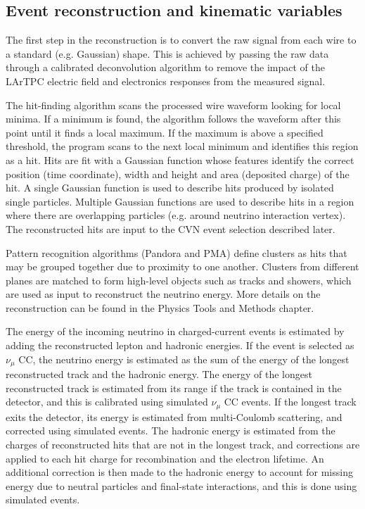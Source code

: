 \subsection{Event reconstruction and kinematic variables}
The first step in the reconstruction is to convert the raw signal from each wire to a standard (e.g. Gaussian) shape. This is achieved by passing the raw data through a calibrated deconvolution algorithm to remove the impact of the LArTPC electric field and electronics responses from the measured signal.

The hit-finding algorithm scans the processed wire waveform looking for local minima. If a minimum is found, the algorithm follows the waveform after this point until it finds a local maximum. If the maximum is above a specified threshold, the program scans to the next local minimum and identifies this region as a hit. Hits are fit with a Gaussian function whose features identify the correct position (time coordinate), width and height and area (deposited charge) of the hit. A single Gaussian function is used to describe hits produced by isolated single particles. Multiple Gaussian functions are used to describe hits in a region where there are overlapping particles (e.g. around neutrino interaction vertex). The reconstructed hits are input to the CVN event selection described later.

Pattern recognition algorithms (Pandora and PMA) define clusters as hits that may be grouped together due to proximity to one another. Clusters from different planes are matched to form high-level objects such as tracks and showers, which are used as input to reconstruct the neutrino energy. More details on the reconstruction can be found in the Physics Tools and Methods chapter.


The energy of the incoming neutrino in charged-current events is estimated by adding the reconstructed lepton and hadronic energies. 
If the event is selected as $\nu_{\mu}$ CC, the 
neutrino energy is estimated as the sum of the energy of the longest reconstructed track and the hadronic energy. The energy of the longest reconstructed track is estimated from its 
range if the track is contained in the detector, and this is calibrated using simulated $\nu_{\mu}$ CC events. If the longest track exits the detector, its energy is estimated from 
multi-Coulomb scattering, and corrected using simulated events. The hadronic energy is estimated from the charges of reconstructed hits that 
are not in the longest track, and corrections are applied to each hit charge for recombination and the electron lifetime. An additional correction is then made to the hadronic energy to account for missing energy due to neutral particles and final-state interactions, and this is done using simulated events. 

